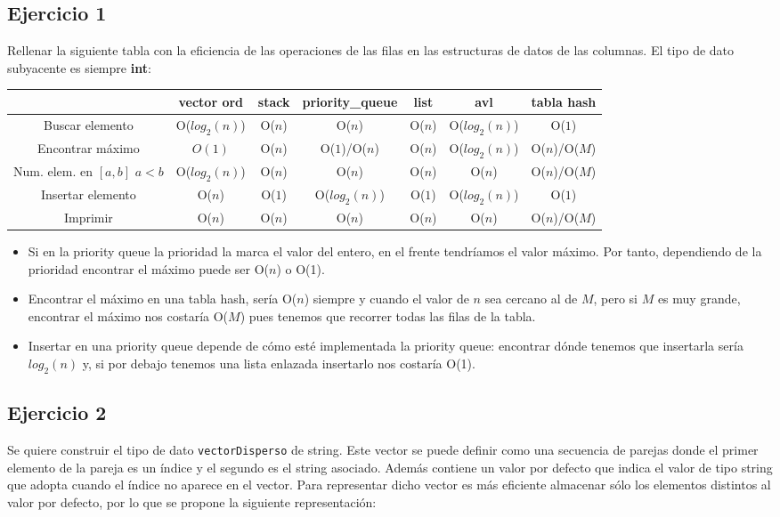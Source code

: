 \documentclass[10pt,a4paper,spanish]{report}
\begin{document}
\subsection{\textcolor[rgb]{0.5,0.8,1}Ejercicio 1}
\noindent
Rellenar la siguiente tabla con la eficiencia de las operaciones de las filas en las estructuras de datos de las columnas. El tipo de dato subyacente es siempre \textbf{int}:
\begin{table}[H]
\scriptsize
\begin{tabular}{|c||c|c|c|c|c|c|}\hline
& vector ord & stack & priority\_queue & list & avl & tabla hash \\
\hline
Buscar elemento & O($log_2 (n)$) & O($n$) & O($n$) & O($n$) & O($log_2 (n)$) & O($1$) \\\hline
Encontrar máximo & $O(1)$ & O($n$) & O($1$)/O($n$) & O($n$) & O($log_2 (n)$) & O($n$)/O($M$) \\ \hline
Num. elem. en $[a,b]$ $a < b$ & O($log_2 (n)$) & O($n$) & O($n$) & O($n$) & O($n$) & O($n$)/O($M$) \\ \hline
Insertar elemento & O($n$) & O($1$) & O($log_2 (n)$) & O($1$) & O($log_2 (n)$) & O($1$) \\ \hline
Imprimir & O($n$) & O($n$) & O($n$) & O($n$) & O($n$) & O($n$)/O($M$) \\ \hline
\end{tabular}
\end{table}
\noindent
\begin{itemize}
\item Si en la priority queue la prioridad la marca el valor del entero, en el frente tendríamos el valor máximo. 
      Por tanto, dependiendo de la prioridad encontrar el máximo puede ser O($n$) o O(1). 
\item Encontrar el máximo en una tabla hash, sería O($n$) siempre y cuando el valor de $n$ sea cercano al de $M$, pero si $M$ es muy grande,
      encontrar el máximo nos costaría O($M$) pues tenemos que recorrer todas las filas de la tabla.
\item Insertar en una priority queue depende de cómo esté implementada la priority queue: encontrar dónde tenemos que insertarla sería $log_2 (n)$ y, 
      si por debajo tenemos una lista enlazada insertarlo nos costaría O(1).
    
\end{itemize}      

\subsection{\textcolor[rgb]{0.5,0.8,1}Ejercicio 2}
\noindent
Se quiere construir el tipo de dato \verb*|vectorDisperso| de string. Este vector se puede definir como una secuencia de parejas
donde el primer elemento de la pareja es un índice y el segundo es el string asociado. Además contiene un valor por defecto
que indica el valor de tipo string  que  adopta cuando el índice no aparece en el vector. 
 Para representar dicho vector es más eficiente almacenar sólo los elementos distintos al valor 
por defecto, por lo que se propone la siguiente representación:
\end{document}
